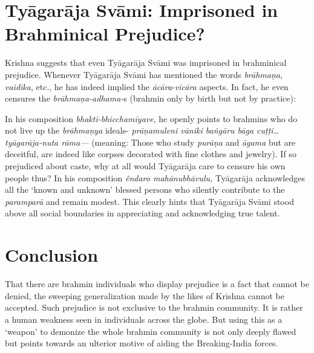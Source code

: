 \section*{Tyāgarāja Svāmi: Imprisoned in Brahminical Prejudice?}

Krishna suggests that even Tyāgarāja Svāmi was imprisoned in brahminical prejudice. Whenever Tyāgarāja Svāmi has mentioned the words \textit{brāhmaṇa}, \textit{vaidika}, etc., he has indeed implied the \textit{ācāra}-\textit{vicāra} aspects. In fact, he even censures the \textit{brāhmaṇa-adhama-}s (brahmin only by birth but not by practice):

In his composition \textit{bhakti-bhicchamīyave}, he openly points to brahmins who do not live up the \textit{brāhmaṇya} ideals- \textit{prāṇamuleni vāniki baṅgāru bāga cuṭṭi…tyāgarāja-nuta rāma—} (meaning: Those who study \textit{purāṇa} and \textit{āgama} but are deceitful, are indeed like corpses decorated with fine clothes and jewelry). If so prejudiced about caste, why at all would Tyāgarāja care to censure his own people thus? In his composition \textit{êndaro mahānubhāvulu,} Tyāgarāja acknowledges all the ‘known and unknown’ blessed persons who silently contribute to the \textit{paramparā} and remain modest. This clearly hints that Tyāgarāja Svāmi stood above all social boundaries in appreciating and acknowledging true talent.

\vspace{-.3cm}

\section*{Conclusion}

That there are brahmin individuals who display prejudice is a fact that cannot be denied, the sweeping generalization made by the likes of Krishna cannot be accepted. Such prejudice is not exclusive to the brahmin community. It is rather a human weakness seen in individuals across the globe. But using this as a ‘weapon’ to demonize the whole brahmin community is not only deeply flawed but points towards an ulterior motive of aiding the Breaking-India forces.

